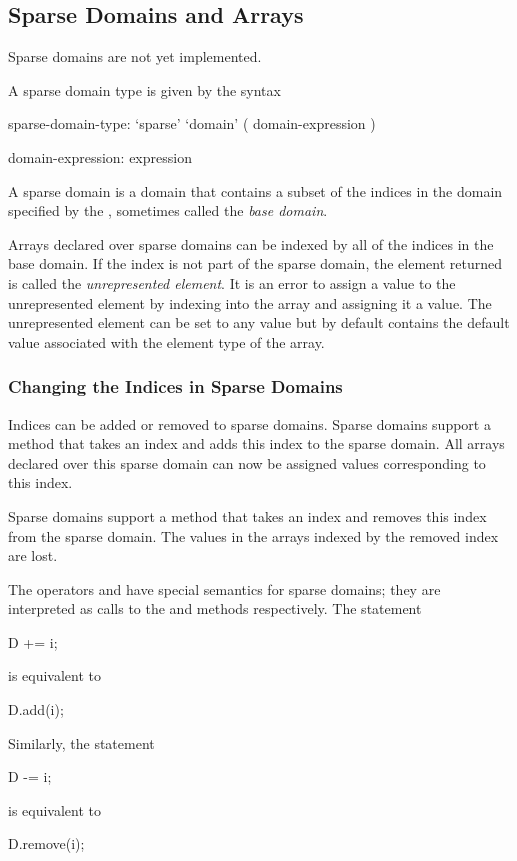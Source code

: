 \subsection{Sparse Domains and Arrays}
\label{Sparse_Domains_and_Arrays}

\begin{implementation}
Sparse domains are not yet implemented.
\end{implementation}

A sparse domain type is given by the syntax
\begin{syntax}
sparse-domain-type:
  `sparse' `domain' ( domain-expression )

domain-expression:
  expression
\end{syntax}
A sparse domain is a domain that contains a subset of the indices in
the domain specified by the , sometimes called
the {\em base domain}.

Arrays declared over sparse domains can be indexed by all of the
indices in the base domain.  If the index is not part of the sparse
domain, the element returned is called the {\em unrepresented
element}.  It is an error to assign a value to the unrepresented
element by indexing into the array and assigning it a value.  The
unrepresented element can be set to any value but by default contains
the default value associated with the element type of the array.

\subsubsection{Changing the Indices in Sparse Domains}

Indices can be added or removed to sparse domains.  Sparse domains
support a method  that takes an index and adds this index to
the sparse domain.  All arrays declared over this sparse domain can
now be assigned values corresponding to this index.

Sparse domains support a method  that takes an index and
removes this index from the sparse domain.  The values in the arrays
indexed by the removed index are lost.

The operators \chpl{+=} and \chpl{-=} have special semantics for
sparse domains; they are interpreted as calls to the 
and  methods respectively.  The statement
\begin{chapel}
D += i;
\end{chapel}
is equivalent to
\begin{chapel}
D.add(i);
\end{chapel}
Similarly, the statement
\begin{chapel}
D -= i;
\end{chapel}
is equivalent to
\begin{chapel}
D.remove(i);
\end{chapel}

